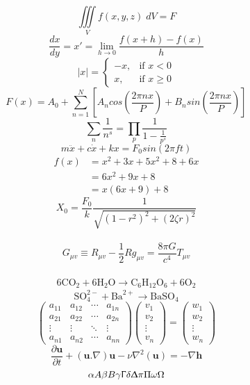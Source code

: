 \documentclass[12pt]{article} %
\begin{document}
\thispagestyle{empty} %
$$ \iiint \limits_{V}f(x,y,z)\;dV=F $$
$$\frac{dx}{dy} = x'= \lim_{h \to 0}\frac{f(x+h)-f(x)}{h} $$
\begin{equation*} %
\lvert x \lvert  = 
    \begin{cases}
        -x, & \text{if } x<0 \\
        x, & \text{if } x\geq 0
    \end{cases}
\end{equation*}
$$F(x) = A_0+\sum_{n=1}^{N}\left[A_ncos\left(\frac{2\pi nx}{P}\right)+B_nsin\left(\frac{2\pi nx}{P}\right)\right]$$
$$\sum_{n}\frac{1}{n^s}=\prod_{p}\frac{1}{1-\frac{1}{p^s}}$$
$$m\ddot x + c\dot x + kx = F_0sin\left(2\pi ft\right)$$
\begin{align*}
f(x) &= x^2+3x+5x^2+8+6x \\
&= 6x^2+9x+8 \\
&=x\left(6x+9\right)+8
\end{align*}
$$X_0 = \frac{F_0}{k}\frac{1}{\sqrt{\left(1-r^2\right)^2+\left(2\zeta r\right)^2}}$$\\
$$G_{\mu v} \equiv R_{\mu v} - \frac{1}{2}Rg_{\mu v} = \frac{8\pi G}{c^4}T_{\mu v}$$\
\begin{align*} %
\text{6CO}_2 + \text{6H}_2\text{O} \rightarrow \text{C}_6\text{H}_{12}\text{O}_6+\text{6O}_2
\end{align*}
$$\text{SO}_4^{2-} + \text{Ba}^{2+} \rightarrow  \text{BaSO}_4$$
$$
\begin{pmatrix}
a_{11} & a_{12} & \cdots & a_{1n} \\
a_{21} & a_{22} & \cdots & a_{2n} \\
\vdots  & \vdots  & \ddots & \vdots  \\
a_{n1} & a_{n2} & \cdots & a_{nn} 
\end{pmatrix}\begin{pmatrix}
v_1 \\
v_2 \\
\vdots \\
v_n
\end{pmatrix}=\begin{pmatrix}
w_1 \\
w_2 \\
\vdots \\
w_n
\end{pmatrix}$$
$$\frac{\partial \textbf{u}}{\partial t} + \left(\textbf{u}.\nabla\right)\textbf{u} -\nu\nabla^2\left(\textbf{u}\right) = -\nabla \textbf{h} $$
$$\alpha A \beta B\gamma \Upgamma \delta \Updelta \pi \Pi \omega \Omega$$ %
\end{document}
